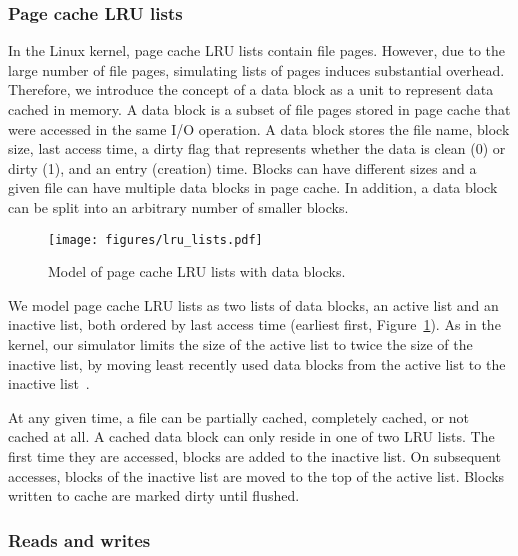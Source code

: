 \documentclass[conference]{IEEEtran}
\begin{document}
    \subsubsection{Page cache LRU lists}

    In the Linux kernel, page cache LRU lists contain file pages. However,
    due to the large number of file pages, simulating lists of pages
    induces substantial overhead.
    Therefore, we introduce the concept of a data block as a unit to represent data
    cached in memory. A data block is a subset of file pages stored in
    page cache that were accessed in the same I/O operation.
    A data block stores the file name, block size, last access
    time, a dirty flag that represents whether the data is clean (0)
    or dirty (1), and an entry (creation) time.
    Blocks can have different sizes and a given file can have multiple
    data blocks in page cache. In addition, a data block can be split into an
    arbitrary number of smaller blocks.
    \begin{figure}
           \centering
           \texttt{[image: figures/lru\_lists.pdf]}
           \caption{Model of page cache LRU lists with data blocks.}
           \label{fig:lrulist}
    \end{figure}

    We model page cache LRU lists as
    two lists of data blocks, an active list and an inactive list, both ordered by
    last access time (earliest first, Figure~\ref{fig:lrulist}).
    As in the kernel, our simulator limits the size of the active list to
    twice the size of the inactive list, by moving least recently
    used data blocks from the active list to the inactive list~\cite{gorman2004understanding, linuxdev3rd2010}.

    At any given time, a file can be partially cached, completely cached,
    or not cached at all. A cached data block can only reside in one of two
    LRU lists. The first time they are accessed, blocks are
    added to the inactive list. On subsequent accesses, blocks of the
    inactive list are moved to the top of the active list. Blocks
    written to cache are marked dirty until flushed.

    \subsubsection{Reads and writes}
\end{document}
